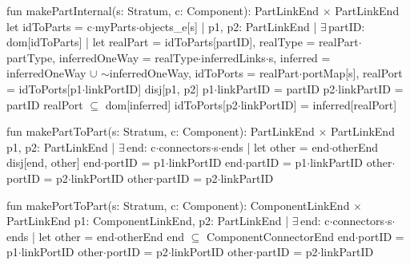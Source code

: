 fun makePartInternal(s: Stratum, c: Component): PartLinkEnd$\,\times\,$PartLinkEnd
{
  let
    idToParts = c$\cdot$myParts$\cdot$objects_e[s] |
  { p1, p2: PartLinkEnd |
    $\exists\,$partID: dom[idToParts] |
    let
      realPart = idToParts[partID],
      realType = realPart$\cdot$partType,
      inferredOneWay = realType$\cdot$inferredLinks$\cdot$s,
      inferred = inferredOneWay $\cup$  $\sim$inferredOneWay,
      idToPorts = realPart$\cdot$portMap[s],
      realPort = idToPorts[p1$\cdot$linkPortID]
    {
      disj[p1, p2]
      p1$\cdot$linkPartID = partID
      p2$\cdot$linkPartID = partID
      realPort $\subseteq$ dom[inferred]
      idToPorts[p2$\cdot$linkPortID] = inferred[realPort]
    }
  }
}

fun makePartToPart(s: Stratum, c: Component): PartLinkEnd$\,\times\,$PartLinkEnd
{
  { p1, p2: PartLinkEnd |
    $\exists\,$end: c$\cdot$connectors$\cdot$s$\cdot$ends | let other = end$\cdot$otherEnd
    {
      disj[end, other]
      end$\cdot$portID = p1$\cdot$linkPortID
      end$\cdot$partID = p1$\cdot$linkPartID
      other$\cdot$portID = p2$\cdot$linkPortID
      other$\cdot$partID = p2$\cdot$linkPartID
    }  
  }
}


fun makePortToPart(s: Stratum, c: Component): ComponentLinkEnd$\,\times\,$PartLinkEnd
{
  { p1: ComponentLinkEnd, p2: PartLinkEnd |
    $\exists\,$end: c$\cdot$connectors$\cdot$s$\cdot$ends | let other = end$\cdot$otherEnd
    {
      end $\subseteq$ ComponentConnectorEnd
      end$\cdot$portID = p1$\cdot$linkPortID
      other$\cdot$portID = p2$\cdot$linkPortID
      other$\cdot$partID = p2$\cdot$linkPartID
    }  
  }
}


